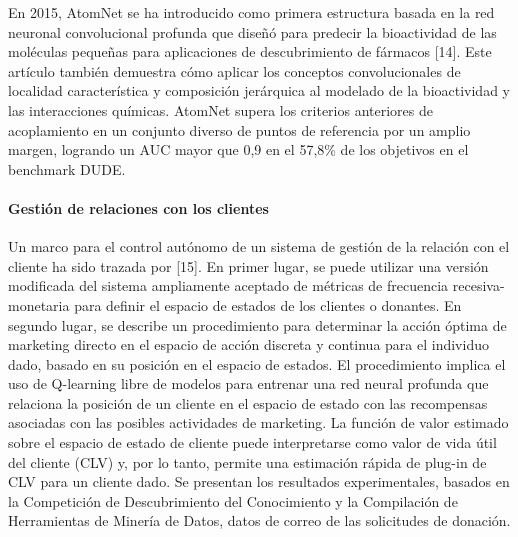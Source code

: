 En 2015, AtomNet se ha introducido como primera estructura basada en la red neuronal convolucional profunda que diseñó para predecir la bioactividad de las moléculas pequeñas para aplicaciones de descubrimiento de fármacos [14]. Este artículo también demuestra cómo aplicar los conceptos convolucionales de localidad característica y composición jerárquica al modelado de la bioactividad y las interacciones químicas. AtomNet supera los criterios anteriores de acoplamiento en un conjunto diverso de puntos de referencia por un amplio margen, logrando un AUC mayor que 0,9 en el 57,8\% de los objetivos en el benchmark DUDE.



\paragraph{Gestión de relaciones con los clientes} Un marco para el control autónomo de un sistema de gestión de la relación con el cliente ha sido trazada por [15]. En primer lugar, se puede utilizar una versión modificada del sistema ampliamente aceptado de métricas de frecuencia recesiva-monetaria para definir el espacio de estados de los clientes o donantes. En segundo lugar, se describe un procedimiento para determinar la acción óptima de marketing directo en el espacio de acción discreta y continua para el individuo dado, basado en su posición en el espacio de estados. El procedimiento implica el uso de Q-learning libre de modelos para entrenar una red neural profunda que relaciona la posición de un cliente en el espacio de estado con las recompensas asociadas con las posibles actividades de marketing. La función de valor estimado sobre el espacio de estado de cliente puede interpretarse como valor de vida útil del cliente (CLV) y, por lo tanto, permite una estimación rápida de plug-in de CLV para un cliente dado. Se presentan los resultados experimentales, basados ​​en la Competición de Descubrimiento del Conocimiento y la Compilación de Herramientas de Minería de Datos, datos de correo de las solicitudes de donación.



